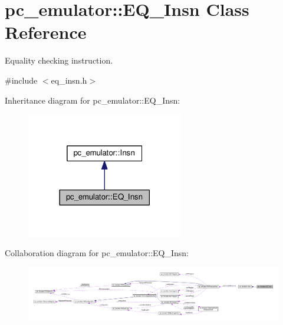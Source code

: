 \hypertarget{classpc__emulator_1_1EQ__Insn}{}\section{pc\+\_\+emulator\+:\+:E\+Q\+\_\+\+Insn Class Reference}
\label{classpc__emulator_1_1EQ__Insn}


Equality checking instruction.  




{\ttfamily \#include $<$eq\+\_\+insn.\+h$>$}



Inheritance diagram for pc\+\_\+emulator\+:\+:E\+Q\+\_\+\+Insn\+:
\nopagebreak
\begin{figure}[H]
\begin{center}
\leavevmode
\includegraphics[width=194pt]{classpc__emulator_1_1EQ__Insn__inherit__graph}
\end{center}
\end{figure}


Collaboration diagram for pc\+\_\+emulator\+:\+:E\+Q\+\_\+\+Insn\+:
\nopagebreak
\begin{figure}[H]
\begin{center}
\leavevmode
\includegraphics[width=350pt]{classpc__emulator_1_1EQ__Insn__coll__graph}
\end{center}
\end{figure}
